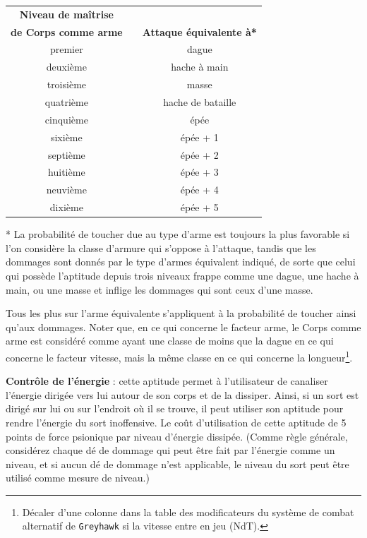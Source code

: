 \documentclass[11pt]{article}
\begin{document}
{{\parindent2cm\begin{tabular}{cp{2.5cm}c}
\textbf{Niveau de maîtrise} && \\
\textbf{de Corps comme arme} && \textbf{Attaque équivalente à*} \\
premier && dague \\
deuxième && hache à main \\
troisième && masse \\
quatrième && hache de bataille \\
cinquième && épée \\
sixième && épée + 1 \\
septième && épée + 2 \\
huitième && épée + 3 \\
neuvième && épée + 4 \\
dixième && épée + 5 \\
\end{tabular}}

\bigskip

* La probabilité de toucher due au type d'arme est toujours la plus favorable si l'on considère la classe d'armure qui s'oppose à l'attaque, tandis que les dommages sont donnés par le type d'armes équivalent indiqué, de sorte que celui qui possède l'aptitude depuis trois niveaux frappe comme une dague, une hache à main, ou une masse et inflige les dommages qui sont ceux d'une masse.

\bigskip

Tous les plus sur l'arme équivalente s'appliquent à la probabilité de toucher ainsi qu'aux dommages. Noter que, en ce qui concerne le facteur arme, le Corps comme arme est considéré comme ayant une classe de moins que la dague en ce qui concerne le facteur vitesse, mais la même classe en ce qui concerne la longueur\footnote{Décaler d'une colonne dans la table des modificateurs du système de combat alternatif de \texttt{Greyhawk} si la vitesse entre en jeu (NdT).}.

\bigskip

\textbf{Contrôle de l'énergie} : cette aptitude permet à l'utilisateur de canaliser l'énergie dirigée vers lui autour de son corps et de la dissiper. Ainsi, si un sort est dirigé sur lui ou sur l'endroit où il se trouve, il peut utiliser son aptitude pour rendre l'énergie du sort inoffensive. Le coût d'utilisation de cette aptitude de 5 points de force psionique par niveau d'énergie dissipée. (Comme règle générale, considérez chaque dé de dommage qui peut être fait par l'énergie comme un niveau, et si aucun dé de dommage n'est applicable, le niveau du sort peut être utilisé comme mesure de niveau.)

}
\end{document}
